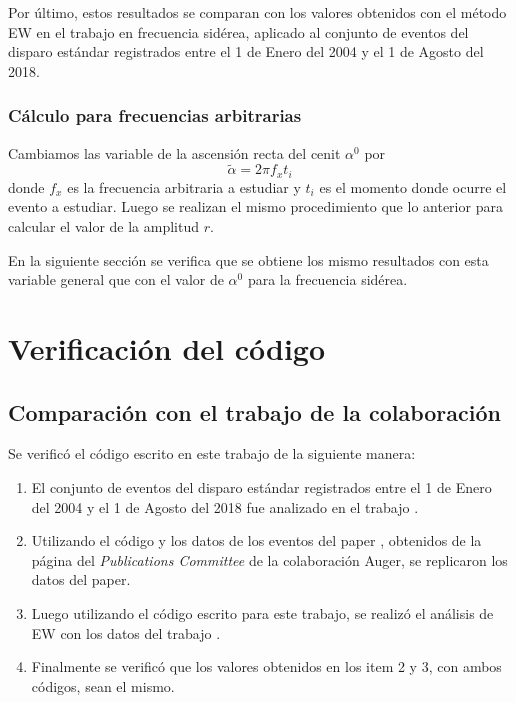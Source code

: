 Por último, estos resultados se comparan con los valores obtenidos con el método EW en el trabajo \cite{Aab_2020} en frecuencia sidérea, aplicado al conjunto de eventos del disparo estándar registrados entre el 1 de Enero del 2004 y el 1 de Agosto del 2018. 



\subsubsection{Cálculo para frecuencias  arbitrarias}

Cambiamos las variable de la ascensión recta del cenit $\alpha^0$ por
\begin{equation}
    \tilde{\alpha} = 2\pi f_x t_i  \label{ra_arb}
  \end{equation}
donde $f_x$ es la frecuencia arbitraria a estudiar y $t_i$ es el momento donde ocurre el evento a estudiar. Luego se realizan el mismo procedimiento que lo anterior para calcular el valor de la amplitud $r$.

En la siguiente sección se verifica que se obtiene los mismo resultados con esta variable general que con el valor de $\alpha^0$ para la frecuencia sidérea.

\section{Verificación del código}

\subsection{Comparación con el trabajo \cite{Aab_2020} de la colaboración}
Se verificó el código escrito en este trabajo de la siguiente manera:

\begin{enumerate}
    \item El conjunto de eventos del disparo estándar registrados entre el 1 de Enero del 2004 y el 1 de Agosto del 2018 fue analizado en el trabajo \cite{Aab_2020}.
    \item Utilizando el código y los datos de los eventos del paper \cite{Aab_2020}, obtenidos de la página del \emph{Publications Committee} de la colaboración Auger, se replicaron los datos del paper. 
    \item Luego utilizando el código escrito para este trabajo, se realizó el análisis de EW con los datos del trabajo \cite{Aab_2020}. 
    \item Finalmente se verificó que los valores obtenidos en los item 2 y 3, con  ambos códigos, sean el mismo.
\end{enumerate}

